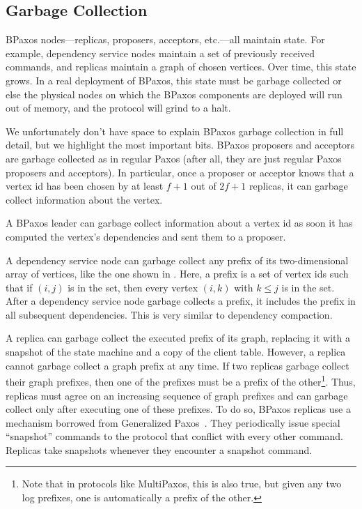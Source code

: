 {}

\subsection{Garbage Collection}
BPaxos nodes---replicas, proposers, acceptors, etc.---all maintain state. For
example, dependency service nodes maintain a set of previously received
commands, and replicas maintain a graph of chosen vertices. Over time, this
state grows. In a real deployment of BPaxos, this state must be garbage
collected or else the physical nodes on which the BPaxos components are
deployed will run out of memory, and the protocol will grind to a halt.

We unfortunately don't have space to explain BPaxos garbage collection in full
detail, but we highlight the most important bits. BPaxos proposers and
acceptors are garbage collected as in regular Paxos (after all, they are just
regular Paxos proposers and acceptors). In particular, once a proposer or
acceptor knows that a vertex id has been chosen by at least $f+1$ out of $2f+1$
replicas, it can garbage collect information about the vertex.

A BPaxos leader can garbage collect information about a vertex id as soon it
has computed the vertex's dependencies and sent them to a proposer.

A dependency service node can garbage collect any prefix of its two-dimensional
array of vertices, like the one shown in . Here, a
prefix is a set of vertex ids such that if $(i, j)$ is in the set, then every
vertex $(i, k)$ with $k \leq j$ is in the set. After a dependency service node
garbage collects a prefix, it includes the prefix in all subsequent
dependencies. This is very similar to dependency compaction.

A replica can garbage collect the executed prefix of its graph, replacing it
with a snapshot of the state machine and a copy of the client table. However, a
replica cannot garbage collect a graph prefix at any time. If two replicas
garbage collect their graph prefixes, then one of the prefixes must be a prefix
of the other\footnote{Note that in protocols like MultiPaxos, this is also
true, but given any two log prefixes, one is automatically a prefix of the
other.}. Thus, replicas must agree on an increasing sequence of graph prefixes
and can garbage collect only after executing one of these prefixes. To do so,
BPaxos replicas use a mechanism borrowed from Generalized
Paxos~\cite{lamport2005generalized}. They periodically issue special
``snapshot'' commands to the protocol that conflict with every other command.
Replicas take snapshots whenever they encounter a snapshot command.

